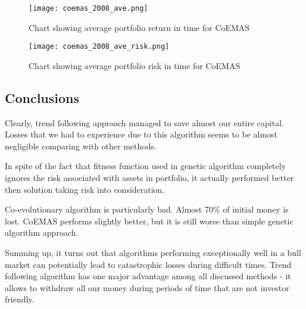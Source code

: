 \begin{figure}[ht]
  \begin{center}
    \texttt{[image: coemas\_2008\_ave.png]}
  \end{center}
  \caption{Chart showing average portfolio return in time for CoEMAS}
  \label{fig:agent_2008_ave_return}
\end{figure}

\begin{figure}[ht]
  \begin{center}
    \texttt{[image: coemas\_2008\_ave\_risk.png]}
  \end{center}
  \caption{Chart showing average portfolio risk in time for CoEMAS}
  \label{fig:agent_2008_ave_risk}
\end{figure}

\subsection{Conclusions}

Clearly, trend following approach managed to save almost our entire capital.
Losses that we had to experience due to this algorithm seems to be almost negligible comparing with other methods.

In spite of the fact that fitness function used in genetic algorithm completely ignores the risk associated with assets in portfolio,       it actually performed better then solution taking risk into consideration.

Co-evolutionary algorithm is particularly bad. 
Almost 70\% of initial money is lost. CoEMAS performs slightly better, but it is still worse than simple genetic algorithm approach.

Summing up, it turns out that algorithms performing exceptionally well in a bull market can potentially lead to catastrophic losses during
difficult times. 
Trend following algorithm has one major advantage among all discussed methods - it allows to withdraw all our money during periods of time
that are not investor friendly.